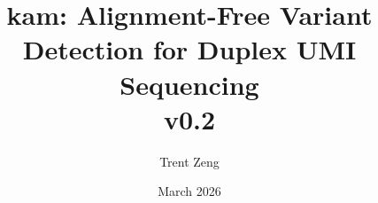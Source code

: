 \documentclass[11pt, onecolumn]{article}
\title{kam: Alignment-Free Variant Detection for Duplex UMI Sequencing\\
\large v0.2}
\author{Trent Zeng}
\date{March 2026}
\begin{document}
\maketitle

\begin{abstract}

\end{abstract}










\printbibliography
\end{document}
